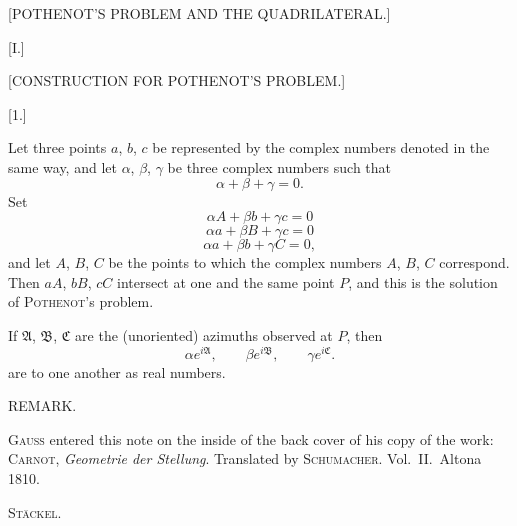 \clearpage{}

\begin{center}
[POTHENOT'S PROBLEM AND THE QUADRILATERAL.]
\end{center}

\begin{center}
[I.]

[CONSTRUCTION FOR POTHENOT'S PROBLEM.]

[1.]
\end{center}

Let three points $a$, $b$, $c$ be represented by the complex
numbers denoted in the same way, and let $\alpha$, $\beta$, $\gamma$ be three
complex numbers such that
\[
\alpha+\beta+\gamma=0.
\]
Set
\[
\alpha A+\beta b+\gamma c=0
\]
\[
\alpha a+\beta B+\gamma c=0
\]
\[
\alpha a+\beta b+\gamma C=0,
\]
and let $A$, $B$, $C$ be the points to which the complex numbers
$A$, $B$, $C$ correspond. Then $aA$,
$bB$, $cC$ intersect at one and the same point $P$, and this is the solution
of \textsc{Pothenot}'s problem.

If $\mathfrak{A}$, $\mathfrak{B}$, $\mathfrak{C}$ are the
(unoriented) azimuths observed at $P$, then
\[
\alpha e^{i\mathfrak{A}}, \qquad \beta e^{i\mathfrak{B}}, \qquad \gamma e^{i\mathfrak{C}}.
\]
are to one another as real numbers.

\begin{center}
REMARK.
\end{center}

\textsc{Gauss} entered this note on the inside of the back cover
of his copy of the work: \textsc{Carnot}, \emph{Geometrie der
Stellung}. Translated by \textsc{Schumacher}. Vol.\ II.\ Altona 1810.

\par\hfill\textsc{Stäckel}.\par
